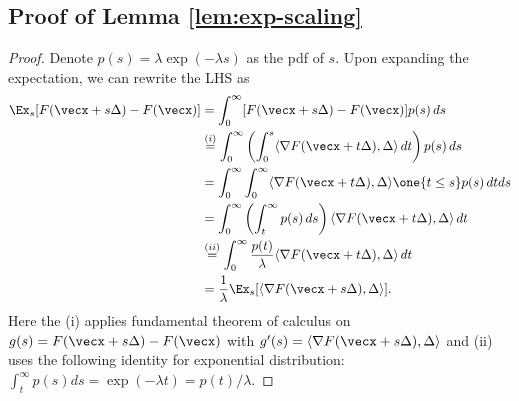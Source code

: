 \subsection{Proof of Lemma \ref{lem:exp-scaling}}

\ExponentialScaling*
\begin{proof}
Denote $p(s)=\lambda\exp(-\lambda s)$ as the pdf of $s$. Upon expanding the expectation, we can rewrite the LHS as
\begin{align*}
    \Ex_s [F(\vecx+s\Delta) - F(\vecx)] 
    &= \int_0^\infty [F(\vecx+s\Delta) - F(\vecx)] p(s) \, ds \\
    &\stackrel{(i)}{=} \int_0^\infty \left( \int_0^s \langle \nabla F(\vecx+t\Delta), \Delta\rangle \, dt \right) p(s)\, ds \\
    &= \int_0^\infty\int_0^\infty \langle \nabla F(\vecx+t\Delta), \Delta\rangle \one\{t\le s\}p(s) \, dtds \\
    &= \int_0^\infty \left(\int_t^\infty p(s)\, ds\right) \langle \nabla F(\vecx+t\Delta),\Delta\rangle \, dt \\
    &\stackrel{(ii)}{=} \int_0^\infty \frac{p(t)}{\lambda} \langle \nabla F(\vecx+t\Delta),\Delta\rangle \, dt \\
    &= \frac{1}{\lambda} \Ex_s [\langle\nabla F(\vecx+s\Delta), \Delta\rangle].
\end{align*}
Here the (i) applies fundamental theorem of calculus on $g(s)=F(\vecx+s\Delta)-F(\vecx)$ with $g'(s)=\langle \nabla F(\vecx+s\Delta),\Delta\rangle$ and (ii) uses the following identity for exponential distribution: $\int_t^\infty p(s) ds = \exp(-\lambda t) = p(t)/\lambda$.
\end{proof}

